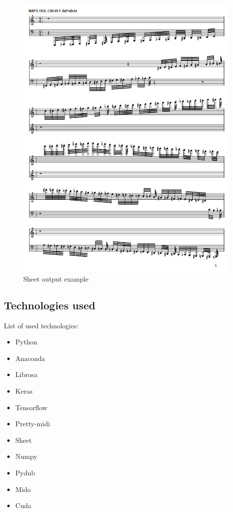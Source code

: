 \begin{figure}[H]
	\caption[Sheet output example]{ Sheet output example }
	\centering
	\label{fig:sheet_output}
	\includegraphics[width=1\textwidth, height=\textheight, keepaspectratio]{"resources/sheet_example"}
\end{figure}

\subsection{Technologies used}
List of used technologies:
\begin{itemize}
	\item Python \cite{python}
	\item Anaconda \cite{anaconda}
	\item Librosa \cite{librosa}
	\item Keras \cite{keras}
	\item Tensorflow \cite{tensorflow}
	\item Pretty-midi \cite{pretty_midi}
	\item Sheet \cite{sheet}
	\item Numpy \cite{numpy}
	\item Pydub \cite{pydub}
	\item Mido \cite{mido}
	\item Cuda \cite{cuda}
	
\end{itemize}